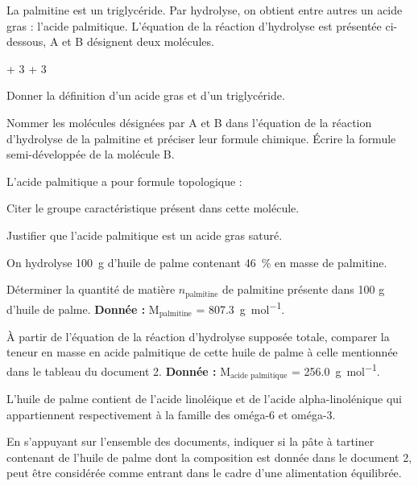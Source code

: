 \numeroQuestion
La palmitine est un triglycéride. Par hydrolyse, on obtient entre autres un acide gras :
l'acide palmitique.
L'équation de la réaction d'hydrolyse est présentée ci-dessous, A et B désignent deux molécules.
\begin{center}  
  + 3 \reaction {} 
  + 3 
\end{center}
  
\numeroSousQuestion
Donner la définition d'un acide gras et d'un triglycéride.

\numeroSousQuestion
Nommer les molécules désignées par A et B dans l'équation de la réaction d'hydrolyse de la palmitine
et préciser leur formule chimique. Écrire la formule semi-développée de la molécule B.

\numeroQuestion L'acide palmitique a pour formule topologique :
\begin{center}
\end{center}

\numeroSousQuestion
Citer le groupe caractéristique présent dans cette molécule.

\numeroSousQuestion
Justifier que l'acide palmitique est un acide gras saturé.

\numeroQuestion
On hydrolyse \qty{100}{\g} d'huile de palme contenant \qty{46}{\percent} en masse de palmitine.

\numeroSousQuestion
Déterminer la quantité de matière $n_\text{palmitine}$ de palmitine présente dans 100 g
d'huile de palme.
\textbf{Donnée :} M$_\text{palmitine}$ = \qty{807,3}{\g\per\mole}.

\numeroSousQuestion
À partir de l'équation de la réaction d'hydrolyse supposée totale,
comparer la teneur en masse en acide palmitique de cette huile de palme à celle mentionnée dans le tableau du document 2.
\textbf{Donnée :} M$_\text{acide palmitique}$ = \qty{256,0}{\g\per\mole}.

\numeroQuestion
L'huile de palme contient de l'acide linoléique et de l'acide alpha-linolénique qui
appartiennent respectivement à la famille des oméga-6 et oméga-3.

En s'appuyant sur l'ensemble des documents, indiquer si la pâte à tartiner contenant de
l'huile de palme dont la composition est donnée dans le document 2, peut être
considérée comme entrant dans le cadre d'une alimentation équilibrée.


